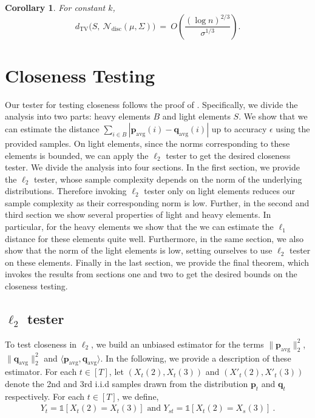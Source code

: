 \documentclass[10pt]{article} %
\theoremstyle{plain}
\newtheorem{corollary}[theorem]{Corollary}
\newcommand{\bp}{\textbf{p}}
\newcommand{\bq}{\textbf{q}}
\newcommand{\avg}{\mathrm{avg}}
\begin{document}
\begin{corollary}
\label{cor:vv-fixed-d}
For constant $k$,
\[
d_{\mathrm{TV}}\!\big(S,\ \mathcal{N}_{\mathrm{disc}}(\mu,\Sigma)\big)
\ = \ O \left( \frac{(\log n)^{2/3}}{\sigma^{1/3}} \right).
\]

\end{corollary}




	
	
	

\section{Closeness Testing}\label{section:closeness}

Our tester for testing closeness follows the proof of \cite{batu2001testing}. Specifically, we divide the analysis into two parts: heavy elements $B$ and light elements $S$. We show that we can estimate the distance $\sum_{i \in B}|\bp_{\avg}(i)-\bq_{\avg}(i)|$ up to accuracy $\epsilon$ using the provided samples. On light elements, since the norms corresponding to these elements is bounded, we can apply the $\ell_2$ tester to get the desired closeness tester. We divide the analysis into four sections. In the first section, we provide the $\ell_2$ tester, whose sample complexity depends on the norm of the underlying distributions. Therefore invoking $\ell_2$ tester only on light elements reduces our sample complexity as their corresponding norm is low. Further, in the second and third section we show several properties of light and heavy elements. In particular, for the heavy elements we show that the we can estimate the $\ell_1$ distance for these elements quite well. Furthermore, in the same section, we also show that the norm of the light elements is low, setting ourselves to use $\ell_2$ tester on these elements. Finally in the last section, we provide the final theorem, which invokes the results from sections one and two to get the desired bounds on the closeness testing.

\subsection{$\ell_2$ tester}
To test closeness in $\ell_2$, we build an unbiased estimator for the terms $\|\bp_{\avg}\|^2_2$, $\|\bq_{\avg}\|^2_2$ and $\langle \bp_{\avg}, \bq_{\avg} \rangle$. In the following, we provide a description of these estimator. For each $t \in [T]$, let $(X_t(2), X_t(3))$ and $(X'_t(2), X'_t(3))$ denote the 2nd and 3rd i.i.d samples drawn from the distribution $\bp_t$ and $\bq_t$ respectively. For each $t\in [T]$, we define,
\begin{align*}
	Y_{t} = \mathds{1}[X_t(2) = X_t(3)] \text{ and }
	Y_{st} = \mathds{1}[X_t(2) = X_s(3)]~.
\end{align*}
\end{document}
